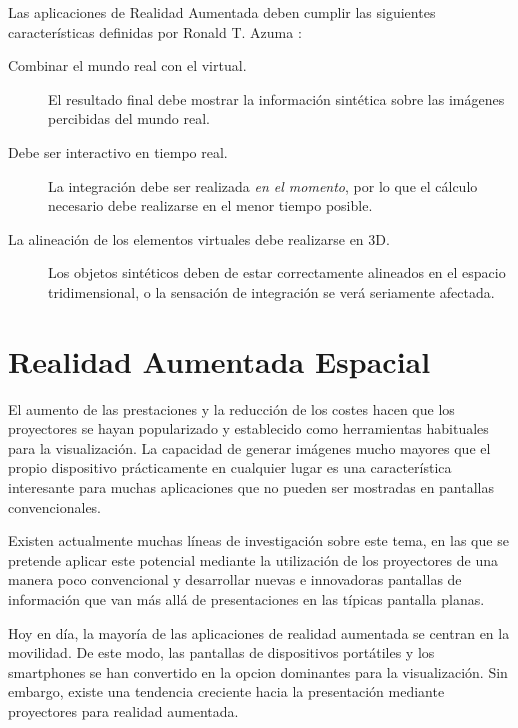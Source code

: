 Las aplicaciones de Realidad Aumentada deben cumplir las siguientes características definidas por Ronald T. Azuma \cite{Azuma}:

\begin{description}
\item[Combinar el mundo real con el virtual.] El resultado final debe mostrar la información sintética sobre las imágenes percibidas del mundo real.
\item[Debe ser interactivo en tiempo real.] La integración debe ser realizada \emph{en el momento}, por lo que el cálculo necesario debe realizarse en el menor tiempo posible.
\item[La alineación de los elementos virtuales debe realizarse en 3D.] Los objetos sintéticos deben de estar correctamente alineados en el espacio tridimensional,  o la sensación de integración se verá seriamente afectada.
\end{description}

\section{Realidad Aumentada Espacial}
  El aumento de las prestaciones y la reducción de los costes hacen que los proyectores se hayan popularizado y establecido como herramientas habituales para la visualización. La capacidad de generar imágenes mucho mayores que el propio dispositivo prácticamente en cualquier lugar es una característica interesante para muchas aplicaciones que no pueden ser mostradas en pantallas convencionales. 

Existen actualmente muchas líneas de investigación sobre este tema, en las que se pretende aplicar este potencial mediante la utilización de los proyectores de una manera poco convencional y desarrollar nuevas e innovadoras pantallas de información que van más allá de presentaciones en las típicas pantalla planas.
 

Hoy en día, la mayoría de las aplicaciones de realidad aumentada se centran en la movilidad. De este modo, las pantallas de dispositivos portátiles y los smartphones se han convertido en la opcion dominantes para la visualización. Sin embargo, existe una tendencia creciente hacia la presentación mediante proyectores para realidad aumentada. 

